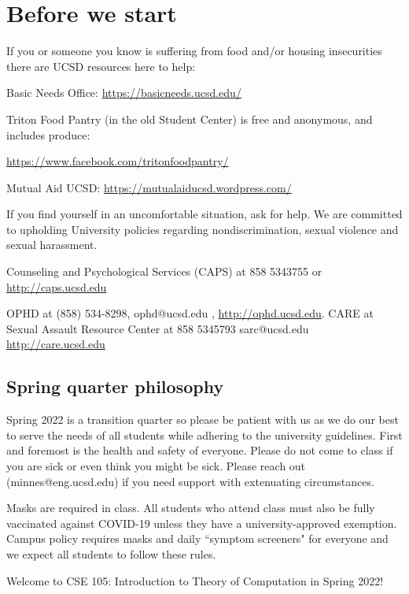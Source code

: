 

\section*{Before we start}
If you or someone you know is suffering from food and/or housing insecurities 
there are UCSD resources here to help:

Basic Needs Office: \href{https://basicneeds.ucsd.edu/}{https://basicneeds.ucsd.edu/}

Triton Food Pantry (in the old Student Center)
is free and anonymous, and includes produce: 

\href{https://www.facebook.com/tritonfoodpantry/}{https://www.facebook.com/tritonfoodpantry/}

Mutual Aid UCSD: \href{https://mutualaiducsd.wordpress.com/}{https://mutualaiducsd.wordpress.com/}

If you find yourself in an uncomfortable situation, ask for help. 
We are committed to upholding University policies regarding nondiscrimination, sexual violence and sexual harassment.

Counseling and Psychological Services (CAPS) at 858 5343755 or \href{http://caps.ucsd.edu}{http://caps.ucsd.edu}


OPHD at (858) 534-8298, ophd@ucsd.edu , \href{http://ophd.ucsd.edu}{http://ophd.ucsd.edu}. 
CARE at Sexual Assault Resource Center at 858 5345793 sarc@ucsd.edu \href{http://care.ucsd.edu}{http://care.ucsd.edu}

\subsection*{Spring quarter philosophy}
Spring 2022 is a transition quarter so please be patient with us as we do our best 
to serve the needs of all students while adhering to the university guidelines. 
First and foremost is the health and safety of everyone.  
Please do not come to class if you are sick or even think you might be sick.
Please reach out (minnes@eng.ucsd.edu) if you need support with extenuating circumstances.

Masks are required in class. All students who attend class must also be fully vaccinated against COVID-19
unless they have a university-approved exemption.
Campus policy requires masks and daily ``symptom screeners" for everyone and we expect all students 
to follow these rules. 


\newpage
Welcome to CSE 105: Introduction to Theory of Computation in Spring 2022!

